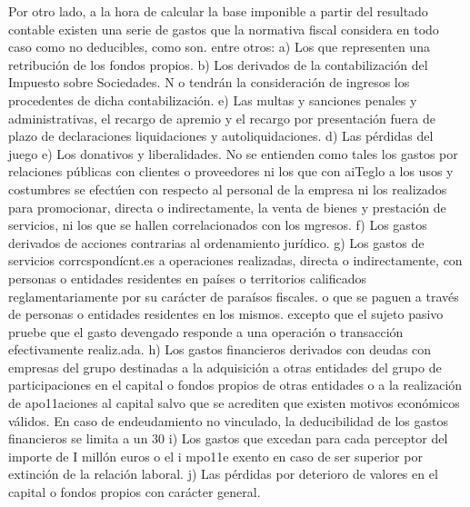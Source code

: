 \documentclass[10pt,a4paper]{article}
\begin{document}
Por otro lado, a la hora de calcular la base imponible a partir del resultado contable existen una serie de gastos que la normativa fiscal considera en todo caso como no deducibles, como son. entre otros:
a) Los que representen una retribución de los fondos propios.
b) Los derivados de la contabilización del Impuesto sobre Sociedades. N o tendrán la consideración de ingresos los procedentes de dicha contabilización.
e) Las multas y sanciones penales y administrativas, el recargo de apremio y el recargo por presentación fuera de plazo de declaraciones liquidaciones y autoliquidaciones.
d) Las pérdidas del juego
e) Los donativos y liberalidades. No se entienden como tales los gastos por relaciones públicas con clientes o proveedores ni los que con aiTeglo a los usos y costumbres se efectúen con respecto al personal de la empresa ni los realizados para promocionar, directa o indirectamente, la venta de bienes y prestación de servicios, ni los que se hallen correlacionados con los mgresos.
f) Los gastos derivados de acciones contrarias al ordenamiento jurídico.
g) Los gastos de servicios corrcspondícnt.es a operaciones realizadas, directa o indirectamente, con personas o entidades residentes en países o territorios calificados reglamentariamente por su carácter de paraísos fiscales. o que se paguen a través de personas o entidades residentes en los mismos. excepto que el sujeto pasivo pruebe que el gasto devengado responde a una operación o transacción efectivamente realiz.ada.
h) Los gastos financieros derivados con deudas con empresas del grupo destinadas a la adquisición a otras entidades del grupo de participaciones en el capital o fondos propios de otras entidades o a la realización de apo11aciones al capital salvo que se acrediten que existen motivos económicos válidos. En caso de endeudamiento no vinculado, la deducibilidad de los gastos financieros se limita a un 30 %
i) Los gastos que excedan para cada perceptor del importe de I millón euros o el i mpo11e exento en caso de ser superior por extinción de la relación laboral.
j) Las pérdidas por deterioro de valores en el capital o fondos propios con carácter general.
\end{document}

